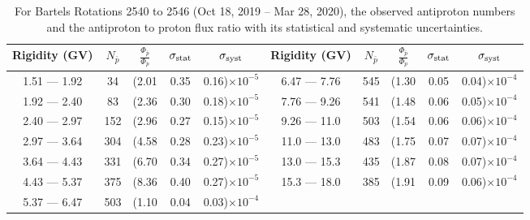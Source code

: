 \begin{table}[p] 
\renewcommand\baselinestretch{1.3}\selectfont
\setlength\tabcolsep{3pt}
\centering
\begin{tabular}{ccccc | ccccc}
\hline
\textbf{Rigidity}  (GV)  & $N_{\bar{p}}$ & $\frac{\Phi_{\bar{p}}}{\Phi_{p}}$ & $\sigma_{\rm{stat}}$ & $\sigma_{\rm{syst}}$ \hspace{1cm}   & \textbf{Rigidity}  (GV)  & $N_{\bar{p}}$ & $\frac{\Phi_{\bar{p}}}{\Phi_{p}}$ & $\sigma_{\rm{stat}}$ & $\sigma_{\rm{syst}}$ \hspace{1cm} \\ 
\hline
1.51 — 1.92   &  34                  &(2.01                          &  0.35              &      0.16)$\times 10^{-5}$  & 6.47 — 7.76                &  545                    &(1.30                                &  0.05                   &      0.04)$\times 10^{-4}$\\
1.92 — 2.40   &  83                  &(2.36                          &  0.30              &      0.18)$\times 10^{-5}$  & 7.76 — 9.26                &  541                    &(1.48                                &  0.06                   &      0.05)$\times 10^{-4}$\\
2.40 — 2.97   &  152                &(2.96                          &  0.27              &      0.15)$\times 10^{-5}$  & 9.26 — 11.0                &  503                    &(1.54                                &  0.06                   &      0.06)$\times 10^{-4}$\\    
2.97 — 3.64   &  304                &(4.58                          &  0.28              &      0.23)$\times 10^{-5}$  & 11.0 — 13.0                 &  483                    &(1.75                                &  0.07                   &      0.07)$\times 10^{-4}$\\    
3.64 — 4.43   &  331                &(6.70                          &  0.34              &      0.27)$\times 10^{-5}$  & 13.0 — 15.3               &  435                    &(1.87                                &  0.08                   &      0.07)$\times 10^{-4}$\\
4.43 — 5.37   &  375                &(8.36                          &  0.40              &      0.27)$\times 10^{-5}$  & 15.3 — 18.0               &  385                    &(1.91                                &  0.09                   &      0.06)$\times 10^{-4}$\\
5.37 — 6.47   &  503                &(1.10                          &  0.04              &      0.03)$\times 10^{-4}$  & \\
\hline
\end{tabular}
\caption[Antiproton to proton flux ratio for Bartels Rotations 2540 to 2546]{For Bartels Rotations 2540 to 2546 (Oct 18, 2019 – Mar 28, 2020), the observed antiproton numbers and the antiproton to proton flux ratio with its statistical and systematic uncertainties.}
\label{TableOfDependent20}
\end{table}

